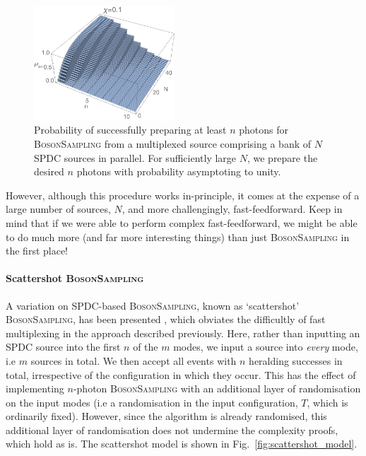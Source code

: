 \begin{figure}[!htb]
\includegraphics[width=0.47\textwidth]{multiplex_bs}
\caption{Probability of successfully preparing at least $n$ photons for \textsc{BosonSampling} from a multiplexed source comprising a bank of $N$ SPDC sources in parallel. For sufficiently large $N$, we prepare the desired $n$ photons with probability asymptoting to unity.} \label{fig:multiplex_bs_res}
\end{figure}

However, although this procedure works in-principle, it comes at the expense of a large number of sources, $N$, and more challengingly, fast-feedforward. Keep in mind that if we were able to perform complex fast-feedforward, we might be able to do much more (and far more interesting things) than just \textsc{BosonSampling} in the first place!

%
%

\paragraph{Scattershot \textsc{BosonSampling}} 

A variation on SPDC-based \textsc{BosonSampling}, known as `scattershot' \textsc{BosonSampling}, has been presented \cite{bib:RandBS}, which obviates the difficultly of fast multiplexing in the approach described previously. Here, rather than inputting an SPDC source into the first $n$ of the $m$ modes, we input a source into \textit{every} mode, i.e $m$ sources in total. We then accept all events with $n$ heralding successes in total, irrespective of the configuration in which they occur. This has the effect of implementing $n$-photon \textsc{BosonSampling} with an additional layer of randomisation on the input modes (i.e a randomisation in the input configuration, $T$, which is ordinarily fixed). However, since the algorithm is already randomised, this additional layer of randomisation does not undermine the complexity proofs, which hold as is. The scattershot model is shown in Fig.~\ref{fig:scattershot_model}.


